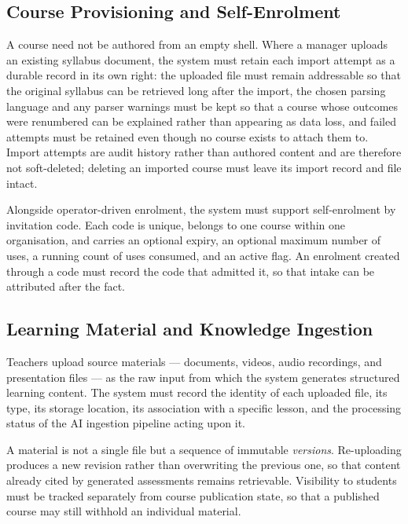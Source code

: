\subsection{Course Provisioning and Self-Enrolment}

A course need not be authored from an empty shell. Where a manager
uploads an existing syllabus document, the system must retain each
import attempt as a durable record in its own right: the uploaded file
must remain addressable so that the original syllabus can be retrieved
long after the import, the chosen parsing language and any parser
warnings must be kept so that a course whose outcomes were renumbered
can be explained rather than appearing as data loss, and failed
attempts must be retained even though no course exists to attach them
to. Import attempts are audit history rather than authored content and
are therefore not soft-deleted; deleting an imported course must leave
its import record and file intact.

Alongside operator-driven enrolment, the system must support
self-enrolment by invitation code. Each code is unique, belongs to one
course within one organisation, and carries an optional expiry, an
optional maximum number of uses, a running count of uses consumed, and
an active flag. An enrolment created through a code must record the
code that admitted it, so that intake can be attributed after the fact.

\subsection{Learning Material and Knowledge Ingestion}
Teachers upload source materials — documents, videos, audio recordings, 
and presentation files — as the raw input from which the system 
generates structured learning content. The system must record the 
identity of each uploaded file, its type, its storage location, its
association with a specific lesson, and the processing status of the
AI ingestion pipeline acting upon it.

A material is not a single file but a sequence of immutable
\textit{versions}. Re-uploading produces a new revision rather than
overwriting the previous one, so that content already cited by
generated assessments remains retrievable. Visibility to students must
be tracked separately from course publication state, so that a
published course may still withhold an individual material.

